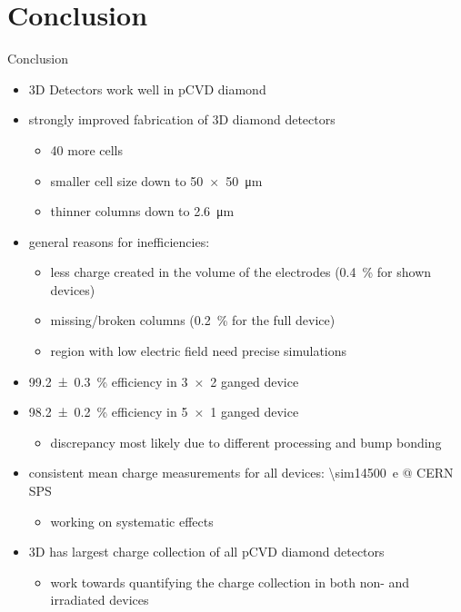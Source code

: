 \section{Conclusion}
\begin{frame}{Conclusion}

		\begin{itemize}\itemfill
			\item 3D Detectors work well in pCVD diamond
			\item strongly improved fabrication of 3D diamond detectors
			\begin{itemize}
				\item \SI{40}{\times} more cells
				\item smaller cell size down to \SI{50x50}{\micro\meter}
				\item thinner columns down to \SI{2.6}{\micro\meter}\vspace*{2ex}
			\end{itemize}
			\item general reasons for inefficiencies:
			\begin{itemize}
				\item less charge created in the volume of the electrodes (\SI{.4}{\%} for shown devices)
				\item missing/broken columns (\SI{.2}{\%} for the full device)
				\item region with low electric field \ra need precise simulations\vspace*{2ex}
			\end{itemize}
			\item \SI{99.2\pm .3}{\%} efficiency in \SI{3x2}{} ganged device
			\item \SI{98.2\pm .2}{\%} efficiency in \SI{5x1}{} ganged device
			\begin{itemize}
				\item discrepancy most likely due to different processing and bump bonding\vspace*{2ex}
			\end{itemize}
			\item consistent mean charge measurements for all devices: \SI{\sim14500}{e} @ CERN SPS
			\begin{itemize}
				\item working on systematic effects
			\end{itemize}
			\item 3D has largest charge collection of all pCVD diamond detectors
			\begin{itemize}
				\item work towards quantifying the charge collection in both non- and irradiated devices
			\end{itemize}
		\end{itemize}
	
\end{frame}
